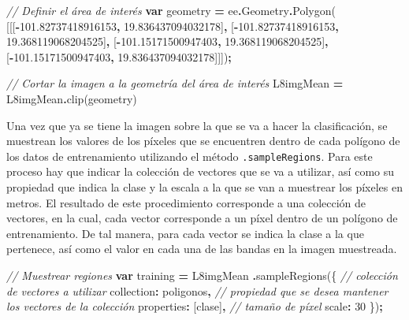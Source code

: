 \documentclass[
  12pt,
  letterpaper,
  twoside]{book}
\newenvironment{Shaded}{\begin{snugshade}}{\end{snugshade}}
\newcommand{\AttributeTok}[1]{\textcolor[rgb]{0.77,0.63,0.00}{#1}}
\newcommand{\CommentTok}[1]{\textcolor[rgb]{0.56,0.35,0.01}{\textit{#1}}}
\newcommand{\DataTypeTok}[1]{\textcolor[rgb]{0.13,0.29,0.53}{#1}}
\newcommand{\DecValTok}[1]{\textcolor[rgb]{0.00,0.00,0.81}{#1}}
\newcommand{\FloatTok}[1]{\textcolor[rgb]{0.00,0.00,0.81}{#1}}
\newcommand{\FunctionTok}[1]{\textcolor[rgb]{0.00,0.00,0.00}{#1}}
\newcommand{\KeywordTok}[1]{\textcolor[rgb]{0.13,0.29,0.53}{\textbf{#1}}}
\newcommand{\NormalTok}[1]{#1}
\newcommand{\OperatorTok}[1]{\textcolor[rgb]{0.81,0.36,0.00}{\textbf{#1}}}
\newcommand{\StringTok}[1]{\textcolor[rgb]{0.31,0.60,0.02}{#1}}
\begin{document}
\begin{Shaded}
\begin{Highlighting}[]
\CommentTok{// Definir el área de interés}
\KeywordTok{var}\NormalTok{ geometry }\OperatorTok{=}\NormalTok{ ee}\OperatorTok{.}\AttributeTok{Geometry}\OperatorTok{.}\FunctionTok{Polygon}\NormalTok{(}
\NormalTok{        [[[}\OperatorTok{{-}}\FloatTok{101.82737418916153}\OperatorTok{,} \FloatTok{19.836437094032178}\NormalTok{]}\OperatorTok{,}
\NormalTok{          [}\OperatorTok{{-}}\FloatTok{101.82737418916153}\OperatorTok{,} \FloatTok{19.368119068204525}\NormalTok{]}\OperatorTok{,}
\NormalTok{          [}\OperatorTok{{-}}\FloatTok{101.15171500947403}\OperatorTok{,} \FloatTok{19.368119068204525}\NormalTok{]}\OperatorTok{,}
\NormalTok{          [}\OperatorTok{{-}}\FloatTok{101.15171500947403}\OperatorTok{,} \FloatTok{19.836437094032178}\NormalTok{]]])}\OperatorTok{;}
          
\CommentTok{// Cortar la imagen a la geometría del área de interés}
\NormalTok{L8imgMean }\OperatorTok{=}\NormalTok{ L8imgMean}\OperatorTok{.}\FunctionTok{clip}\NormalTok{(geometry)}
\end{Highlighting}
\end{Shaded}

Una vez que ya se tiene la imagen sobre la que se va a hacer la clasificación, se muestrean los valores de los píxeles que se encuentren dentro de cada polígono de los datos de entrenamiento utilizando el método \texttt{.sampleRegions}. Para este proceso hay que indicar la colección de vectores que se va a utilizar, así como su propiedad que indica la clase y la escala a la que se van a muestrear los píxeles en metros. El resultado de este procedimiento corresponde a una colección de vectores, en la cual, cada vector corresponde a un píxel dentro de un polígono de entrenamiento. De tal manera, para cada vector se indica la clase a la que pertenece, así como el valor en cada una de las bandas en la imagen muestreada.

\begin{Shaded}
\begin{Highlighting}[]
\CommentTok{// Muestrear regiones }
\KeywordTok{var}\NormalTok{ training }\OperatorTok{=}\NormalTok{ L8imgMean}
  \OperatorTok{.}\FunctionTok{sampleRegions}\NormalTok{(\{}
    \CommentTok{// colección de vectores a utilizar}
    \DataTypeTok{collection}\OperatorTok{:}\NormalTok{ poligonos}\OperatorTok{,}
    \CommentTok{// propiedad que se desea mantener los vectores de la colección}
    \DataTypeTok{properties}\OperatorTok{:}\NormalTok{ [}\StringTok{\textquotesingle{}clase\textquotesingle{}}\NormalTok{]}\OperatorTok{,}
    \CommentTok{// tamaño de píxel}
    \DataTypeTok{scale}\OperatorTok{:} \DecValTok{30}
\NormalTok{  \})}\OperatorTok{;}
\end{Highlighting}
\end{Shaded}
\end{document}
